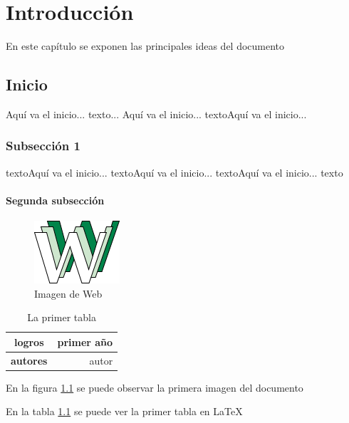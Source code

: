 \chapter{Introducción}
En este capítulo se exponen las principales ideas del documento
\section{Inicio}
Aquí va el inicio... texto...
Aquí va el inicio... textoAquí va el inicio...
\subsection{Subsección 1}
 textoAquí va el inicio... textoAquí va el inicio... textoAquí va el inicio... texto
\subsubsection{Segunda subsección}

\begin{figure}[h]
\begin{center}
\includegraphics[scale=0.4]{capitulo1/Web.png}
\caption{Imagen de Web}
\label{fig:uno}
\end{center}
\end{figure}

\begin{table}
\begin{center}
\begin{tabular}{| c | r |} \hline
\textbf{logros} & primer año \\ \hline
\textbf{autores} & autor \\ \hline
\end{tabular}
\caption{La primer tabla}
\label{tabla1}
\end{center}
\end{table}

En la figura \ref{fig:uno} se puede observar la primera imagen del documento  \cite{llaveLibro1}

En la tabla \ref{tabla1} se puede ver la primer tabla en LaTeX \cite{articulo1}